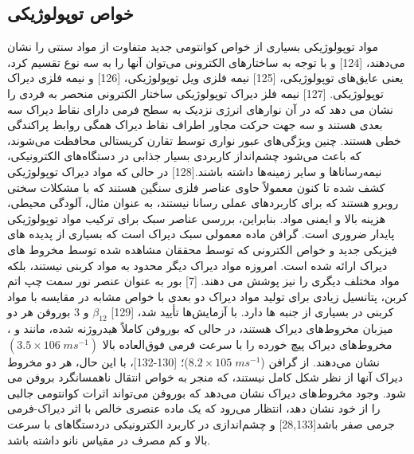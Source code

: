 \subsection{خواص توپولوژیکی}
مواد توپولوژیکی بسیاری از خواص کوانتومی جدید متفاوت از مواد سنتی را نشان می‌دهند، [124] و با توجه به ساختارهای الکترونی می‌توان آنها را به سه نوع تقسیم کرد، یعنی عایق‌های توپولوژیکی، [125] نیمه فلزی ویل توپولوژیکی، [126] و نیمه فلزی دیراک توپولوژیکی. [127] نیمه فلز دیراک توپولوژیکی ساختار الکترونی منحصر به فردی را نشان می دهد که در آن نوارهای انرژی نزدیک به سطح فرمی دارای نقاط دیراک سه بعدی هستند و سه جهت حرکت مجاور اطراف نقاط دیراک همگی روابط پراکندگی خطی هستند. چنین ویژگی‌های عبور نواری توسط تقارن کریستالی محافظت می‌شوند، که باعث می‌شود چشم‌انداز کاربردی بسیار جذابی در دستگاه‌های الکترونیکی، نیمه‌رساناها و سایر زمینه‌ها داشته باشند.[128] در حالی که مواد دیراک توپولوژیکی کشف شده تا کنون معمولاً حاوی عناصر فلزی سنگین هستند که با مشکلات سختی روبرو هستند که برای کاربردهای عملی رسانا نیستند، به عنوان مثال، آلودگی محیطی، هزینه بالا و ایمنی مواد. بنابراین، بررسی عناصر سبک برای ترکیب مواد توپولوژیکی پایدار ضروری است. گرافن ماده معمولی سبک دیراک است که بسیاری از پدیده های فیزیکی جدید و خواص الکترونی که توسط محققان مشاهده شده توسط مخروط های دیراک ارائه شده است. امروزه مواد دیراک دیگر محدود به مواد کربنی نیستند، بلکه مواد مختلف دیگری را نیز پوشش می دهند. [7] بور به عنوان عنصر نور سمت چپ اتم کربن، پتانسیل زیادی برای تولید مواد دیراک دو بعدی با خواص مشابه در مقایسه با مواد کربنی در بسیاری از جنبه ها دارد. با آزمایش‌ها تأیید شد، [129] $\beta_{12}$ و 3 بوروفن هر دو میزبان مخروط‌های دیراک هستند، در حالی که بوروفن کاملاً هیدروژنه شده، مانند  و ، مخروط‌های دیراک پیچ خورده را با سرعت فرمی فوق‌العاده بالا $(3.5 \times 106\; m s^{-1})$ نشان می‌دهند. از گرافن ($8.2\times 105\; m s^{-1}$)؛ [130-132]، با این حال، هر دو مخروط دیراک آنها از نظر شکل کامل نیستند، که منجر به خواص انتقال ناهمسانگرد بروفن می شود. وجود مخروط‌های دیراک نشان می‌دهد که بوروفن می‌تواند اثرات کوانتومی جالبی را از خود نشان دهد، انتظار می‌رود که یک ماده عنصری خالص با اثر دیراک-فرمی جرمی صفر باشد[28,133] و چشم‌اندازی در کاربرد الکترونیکی دردستگاهای با سرعت بالا و کم مصرف در مقیاس نانو داشته باشد.

